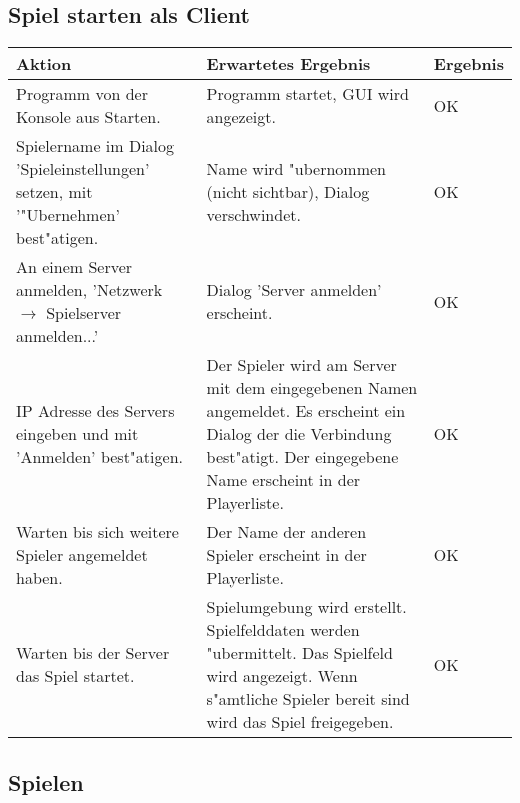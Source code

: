 \subsection{Spiel starten als Client}
\begin{tabular}{|p{50mm}|p{70mm}|p{20mm}|}
\hline
\textbf{Aktion} & \textbf{Erwartetes Ergebnis} & \textbf{Ergebnis}  \\
\hline
Programm von der Konsole aus Starten.  &
Programm startet, GUI wird angezeigt.  &
OK \\
\hline
Spielername im Dialog 'Spieleinstellungen' setzen, mit '"Ubernehmen' best"atigen.  &
Name wird "ubernommen (nicht sichtbar), Dialog verschwindet.  &
OK  \\
\hline
An einem Server anmelden, 'Netzwerk $\rightarrow$ Spielserver anmelden...'  &
Dialog 'Server anmelden' erscheint.  &
OK  \\
\hline
IP Adresse des Servers eingeben und mit 'Anmelden' best"atigen.  &
Der Spieler wird am Server mit dem eingegebenen Namen angemeldet. Es erscheint ein Dialog der die
  Verbindung best"atigt. Der eingegebene Name erscheint in der Playerliste.  &
OK \\
\hline
Warten bis sich weitere Spieler angemeldet haben.  &
Der Name der anderen Spieler erscheint in der Playerliste.  &
OK  \\
\hline
Warten bis der Server das Spiel startet.  &
Spielumgebung wird erstellt. Spielfelddaten werden "ubermittelt. Das Spielfeld wird angezeigt.
  Wenn s"amtliche Spieler bereit sind wird das Spiel freigegeben.  &
OK  \\
\hline
\end{tabular}

\subsection{Spielen}

